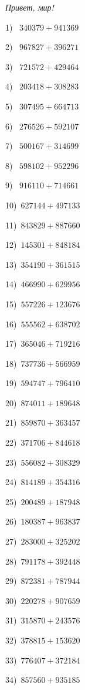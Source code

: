 \documentclass{article}
\begin{document}
 
\begin{center} 
   \large{\textit{Привет, мир!}} 
\end{center}\begin{multicols}{2}
1)$\,\,\,\,\,340379+941369$ \par 
2)$\,\,\,\,\,967827+396271$ \par 
3)$\,\,\,\,\,721572+429464$ \par 
4)$\,\,\,\,\,203418+308283$ \par 
5)$\,\,\,\,\,307495+664713$ \par 
6)$\,\,\,\,\,276526+592107$ \par 
7)$\,\,\,\,\,500167+314699$ \par 
8)$\,\,\,\,\,598102+952296$ \par 
9)$\,\,\,\,\,916110+714661$ \par 
10)$\,\,\,627144+497133$ \par 
11)$\,\,\,843829+887660$ \par 
12)$\,\,\,145301+848184$ \par 
13)$\,\,\,354190+361515$ \par 
14)$\,\,\,466990+629956$ \par 
15)$\,\,\,557226+123676$ \par 
16)$\,\,\,555562+638702$ \par 
17)$\,\,\,365046+719216$ \par 
18)$\,\,\,737736+566959$ \par 
19)$\,\,\,594747+796410$ \par 
20)$\,\,\,874011+189648$ \par 
21)$\,\,\,859870+363457$ \par 
22)$\,\,\,371706+844618$ \par 
23)$\,\,\,556082+308329$ \par 
24)$\,\,\,814189+354316$ \par 
25)$\,\,\,200489+187948$ \par 
26)$\,\,\,180387+963837$ \par 
27)$\,\,\,283000+325202$ \par 
28)$\,\,\,791178+392448$ \par 
29)$\,\,\,872381+787944$ \par 
30)$\,\,\,220278+907659$ \par 
31)$\,\,\,315870+243576$ \par 
32)$\,\,\,378815+153620$ \par 
33)$\,\,\,776407+372184$ \par 
34)$\,\,\,857560+935185$ \par 

\end{multicols}
\end{document}
